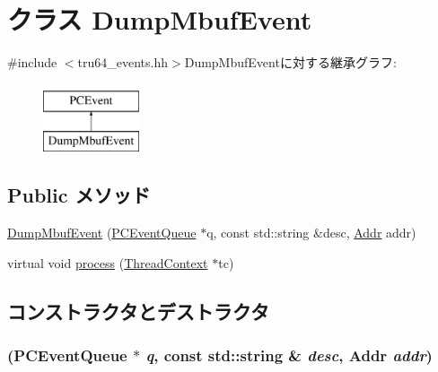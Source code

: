 \hypertarget{classDumpMbufEvent}{
\section{クラス DumpMbufEvent}
\label{classDumpMbufEvent}
}


{\ttfamily \#include $<$tru64\_\-events.hh$>$}DumpMbufEventに対する継承グラフ:\begin{figure}[H]
\begin{center}
\leavevmode
\includegraphics[height=2cm]{classDumpMbufEvent}
\end{center}
\end{figure}
\subsection*{Public メソッド}
\begin{DoxyCompactItemize}
\item 
\hyperlink{classDumpMbufEvent_a7a2bd82f94f55f302dfd9c323b995cac}{DumpMbufEvent} (\hyperlink{classPCEventQueue}{PCEventQueue} $\ast$q, const std::string \&desc, \hyperlink{base_2types_8hh_af1bb03d6a4ee096394a6749f0a169232}{Addr} addr)
\item 
virtual void \hyperlink{classDumpMbufEvent_ad66a9d5ec7cfe597b848a17c0df5cc28}{process} (\hyperlink{classThreadContext}{ThreadContext} $\ast$tc)
\end{DoxyCompactItemize}


\subsection{コンストラクタとデストラクタ}
\hypertarget{classDumpMbufEvent_a7a2bd82f94f55f302dfd9c323b995cac}{
\subsubsection[{DumpMbufEvent}]{ ({\bf PCEventQueue} $\ast$ {\em q}, \/  const std::string \& {\em desc}, \/  {\bf Addr} {\em addr})}}
\label{classDumpMbufEvent_a7a2bd82f94f55f302dfd9c323b995cac}



